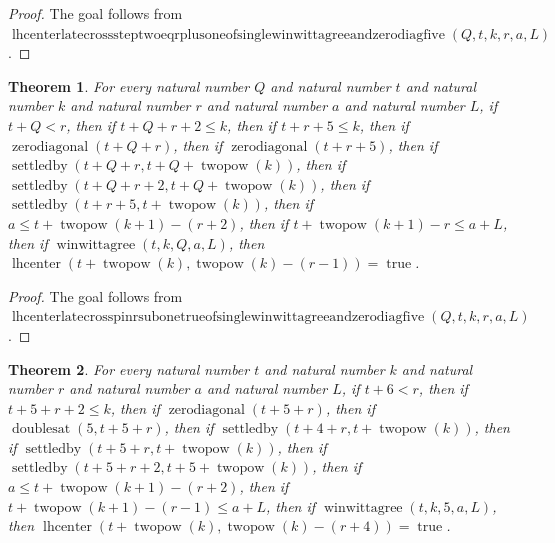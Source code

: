 \documentclass[11pt]{article}
\newtheorem{theorem}{Theorem}[section]
\theoremstyle{definition}
\begin{document}
\begin{proof}
The goal follows from \(\operatorname{lhcenterlatecrosssteptwoeqrplusoneofsinglewinwittagreeandzerodiagfive}(Q, t, k, r, a, L)\).
\end{proof}
\begin{theorem}
\label{ll:paper:lhcenter-late-cross-pin-r-sub-one-true-of-single-winwittagree-and-zero-diag-five}
For every natural number \(Q\) and natural number \(t\) and natural number \(k\) and natural number \(r\) and natural number \(a\) and natural number \(L\), if \(t + Q < r\), then if \(t + Q + r + 2 \le k\), then if \(t + r + 5 \le k\), then if \(\operatorname{zerodiagonal}(t + Q + r)\), then if \(\operatorname{zerodiagonal}(t + r + 5)\), then if \(\operatorname{settledby}(t + Q + r, t + Q + \operatorname{twopow}(k))\), then if \(\operatorname{settledby}(t + Q + r + 2, t + Q + \operatorname{twopow}(k))\), then if \(\operatorname{settledby}(t + r + 5, t + \operatorname{twopow}(k))\), then if \(a \le t + \operatorname{twopow}(k + 1) - (r + 2)\), then if \(t + \operatorname{twopow}(k + 1) - r \le a + L\), then if \(\operatorname{winwittagree}(t, k, Q, a, L)\), then \(\operatorname{lhcenter}(t + \operatorname{twopow}(k), \operatorname{twopow}(k) - (r - 1)) = \operatorname{true}\).
\end{theorem}
\begin{proof}
The goal follows from \(\operatorname{lhcenterlatecrosspinrsubonetrueofsinglewinwittagreeandzerodiagfive}(Q, t, k, r, a, L)\).
\end{proof}
\begin{theorem}
\label{ll:paper:lhcenter-late-cross-pin-r-plus-four-true-of-zero-diag-five-and-single-winwittagree}
For every natural number \(t\) and natural number \(k\) and natural number \(r\) and natural number \(a\) and natural number \(L\), if \(t + 6 < r\), then if \(t + 5 + r + 2 \le k\), then if \(\operatorname{zerodiagonal}(t + 5 + r)\), then if \(\operatorname{doublesat}(5, t + 5 + r)\), then if \(\operatorname{settledby}(t + 4 + r, t + \operatorname{twopow}(k))\), then if \(\operatorname{settledby}(t + 5 + r, t + \operatorname{twopow}(k))\), then if \(\operatorname{settledby}(t + 5 + r + 2, t + 5 + \operatorname{twopow}(k))\), then if \(a \le t + \operatorname{twopow}(k + 1) - (r + 2)\), then if \(t + \operatorname{twopow}(k + 1) - (r - 1) \le a + L\), then if \(\operatorname{winwittagree}(t, k, 5, a, L)\), then \(\operatorname{lhcenter}(t + \operatorname{twopow}(k), \operatorname{twopow}(k) - (r + 4)) = \operatorname{true}\).
\end{theorem}
\end{document}
